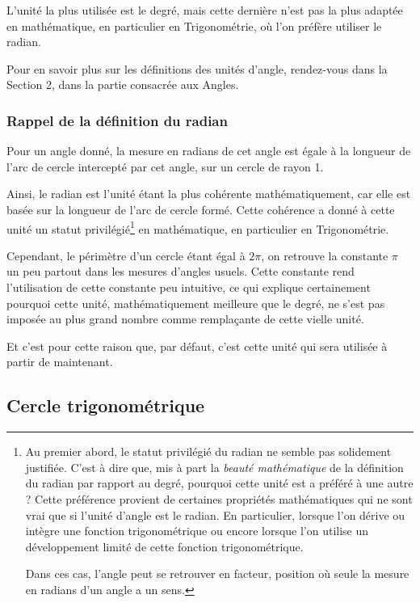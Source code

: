 \documentclass[a4paper]{article}
\begin{document}
			L'unité la plus utilisée est le degré, 
			mais cette dernière n'est pas la plus adaptée 
			en mathématique, en particulier en Trigonométrie,
			où l'on préfère utiliser le radian.

			Pour en savoir plus sur les définitions des unités d'angle,
			rendez-vous dans la Section 2, dans la partie consacrée aux Angles.

			\subsubsection*{Rappel de la définition du radian}

				Pour un angle donné, 
				la mesure en radians de cet angle est égale 
				à la longueur de l'arc de cercle intercepté par cet angle,
				sur un cercle de rayon 1.

				Ainsi, le radian est l'unité étant la plus cohérente mathématiquement,
				car elle est basée sur la longueur de l'arc de cercle formé.
				Cette cohérence a donné à cette unité un statut privilégié\footnote{
					Au premier abord, 
					le statut privilégié du radian ne semble pas solidement justifiée.
					C'est à dire que, mis à part la \textit{beauté mathématique} 
					de la définition du radian par rapport au degré, 
					pourquoi cette unité est a préféré à une autre ?
					Cette préférence provient de certaines propriétés mathématiques 
					qui ne sont vrai que si l'unité d'angle est le radian.
					En particulier, lorsque l'on dérive ou intègre une 
					fonction trigonométrique ou encore lorsque 
					l'on utilise un développement limité de 
					cette fonction trigonométrique.

					Dans ces cas, l'angle peut se retrouver en facteur, 
					position où seule la mesure en radians d'un angle a un sens.
				} en mathématique, en particulier en Trigonométrie.

				Cependant, le périmètre d'un cercle étant égal à $2 \pi$, 
				on retrouve la constante $\pi$ un peu partout 
				dans les mesures d'angles usuels. 
				Cette constante rend l'utilisation 
				de cette constante peu intuitive, 
				ce qui explique certainement pourquoi cette unité, 
				mathématiquement meilleure que le degré, 
				ne s'est pas imposée au plus grand nombre 
				comme remplaçante de cette vielle unité.

				Et c'est pour cette raison que,
				par défaut, c'est cette unité qui sera 
				utilisée à partir de maintenant.

			
		\subsection{Cercle trigonométrique}
\end{document}
